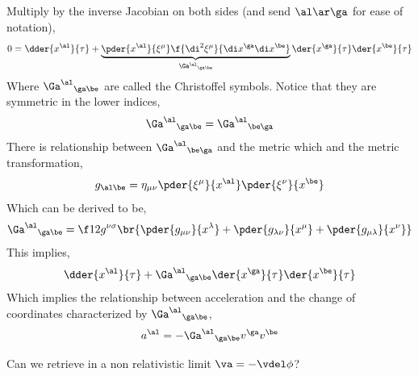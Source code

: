\documentclass{article}
\begin{document}
Multiply by the inverse Jacobian on both sides (and send $\al \ar \ga$ for ease of notation),
\[ 0 = \dder{x^\al}{\tau}  + \underbrace{\pder{x^\al}{\xi^\mu} \f{\di^2\xi^\mu}{\di x^\ga\di x^\be}}_{{\Ga^\al}_{\ga\be}}\der{x^\ga}{\tau}\der{x^\be}{\tau} \]
Where ${\Ga^\al}_{\ga\be}$ are called the Christoffel symbols. Notice that they are symmetric in the lower indices,
\[ {\Ga^\al}_{\ga\be} = {\Ga^\al}_{\be\ga} \]
There is relationship between ${\Ga^\al}_{\be\ga}$ and the metric which and the metric transformation,
\[ g_{\al\be} = \eta_{\mu\nu} \pder{\xi^\mu}{x^\al}\pder{\xi^\nu}{x^\be} \]
Which can be derived to be,
\[ {\Ga^\al}_{\ga\be} = \f12 g^{\nu\sigma}\br{\pder{g_{\mu\nu}}{x^\lambda} + \pder{g_{\lambda\nu}}{x^\mu} + \pder{g_{\mu\lambda}}{x^\nu}} \]
This implies,
\[ \dder{x^\al}{\tau} + {\Ga^\al}_{\ga\be} \der{x^\ga}{\tau} \der{x^\be}{\tau} \]
Which implies the relationship between acceleration and the change of coordinates characterized by ${\Ga^\al}_{\ga\be}$,
\[ a^\al = - {\Ga^\al}_{\ga\be}  v^\ga  v^\be\]

Can we retrieve in a non relativistic limit $\va = - \vdel \phi$?
\end{document}
